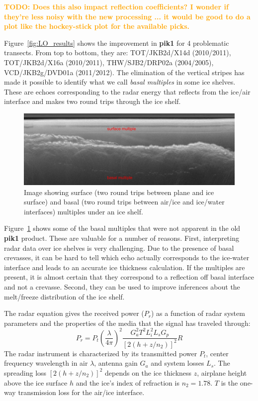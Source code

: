 \documentclass[11pt]{article}
\newcommand{\future}[1]{\ifthenelse{\boolean{include-future}} {\textcolor{Orange}{\textbf{TODO: #1}}}{}}
\newcommand{\figref}[1]{Figure~\ref{#1}}
\begin{document}
\future{Does this also impact reflection coefficients? I wonder if they're less noisy with the new processing ... it would be good to do a plot like the hockey-stick plot for the available picks.}

\figref{fig:LO_results} shows the improvement in \textbf{pik1} for 4 problematic transects. From top to bottom, they are: TOT/JKB2d/X14d (2010/2011), TOT/JKB2d/X16a (2010/2011), THW/SJB2/DRP02a (2004/2005), VCD/JKB2g/DVD01a (2011/2012). 
The elimination of the vertical stripes has made it possible to identify what we call \emph{basal multiples} in some ice shelves. These are echoes corresponding to the radar energy that reflects from the ice/air interface and makes two round trips through the ice shelf. 

\begin{figure}[ht!]
\centering
\includegraphics[width=1.0\columnwidth]{figures/TOT_multiples_small.jpg}
\caption[]{Image showing surface (two round trips between plane and ice surface) and basal (two round trips between air/ice and ice/water interfaces) multiples under an ice shelf.}
\label{fig:multiples}
\end{figure}

\figref{fig:multiples} shows some of the basal multiples that were not apparent in the old \textbf{pik1} product. These are valuable for a number of reasons. First, interpreting radar data over ice shelves is very challenging. Due to the presence of basal crevasses, it can be hard to tell which echo actually corresponds to the ice-water interface and leads to an accurate ice thickness calculation. If the multiples are present, it is almost certain that they correspond to a reflection off basal interface and not a crevasse. Second, they can be used to improve inferences about the melt/freeze distribution of the ice shelf.

The radar equation gives the received power ($P_r$) as a function of radar system parameters and the properties of the media that the signal has traveled through:
\begin{equation}
P_r = P_t \left(\frac{\lambda}{4\pi}\right)^2 \frac{G_a^2 T^2 L_i^2 L_s G_p}{\left[2\left(h+z/n_2 \right) \right]^2}R
\end{equation}
The radar instrument is characterized by its transmitted power $P_t$, center frequency wavelength in air $\lambda$, antenna gain $G_a$ and system losses $L_s$. The spreading loss $\left[2\left(h+z/n_2 \right) \right]^2$ depends on the ice thickness $z$, airplane height above the ice surface $h$ and the ice's index of refraction is $n_2=1.78$. $T$ is the one-way transmission loss for the air/ice interface. 
\end{document}

